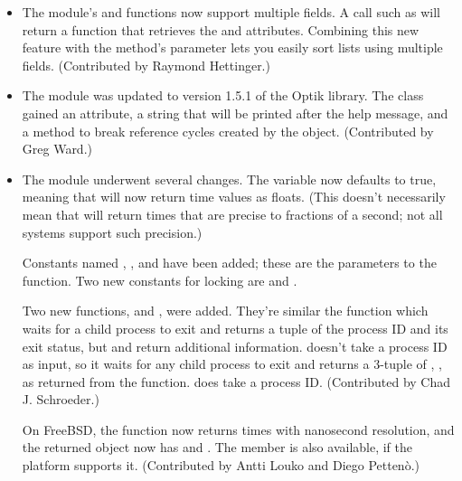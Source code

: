 \documentclass{howto}
\begin{document}
\begin{itemize}
\item The  module's  
and  functions now support multiple fields.  
A call such as 
will return a function 
that retrieves the  and  attributes.  Combining 
this new feature with the  method's  parameter 
lets you easily sort lists using multiple fields.
(Contributed by Raymond Hettinger.)

\item The  module was updated to version 1.5.1 of the
Optik library.  The  class gained an
 attribute, a string that will be printed after the
help message, and a  method to break reference
cycles created by the object. (Contributed by Greg Ward.)

\item The  module underwent several changes.  The
 variable now defaults to true, meaning that
 will now return time values as floats.  (This
doesn't necessarily mean that  will return times
that are precise to fractions of a second; not all systems support
such precision.)

Constants named , , and
 have been added; these are the parameters to the
 function.  Two new constants for locking are
 and .

Two new functions,  and , were
added.  They're similar the  function which waits
for a child process to exit and returns a tuple of the process ID and
its exit status, but  and  return
additional information.   doesn't take a process ID
as input, so it waits for any child process to exit and returns a
3-tuple of , , 
as returned from the  function.
 does take a process ID.
(Contributed by Chad J. Schroeder.)

On FreeBSD, the  function now returns 
times with nanosecond resolution, and the returned object
now has  and .
The  member is also available, if the platform supports it.
(Contributed by Antti Louko and  Diego Petten\`o.)


\end{itemize}
\end{document}
